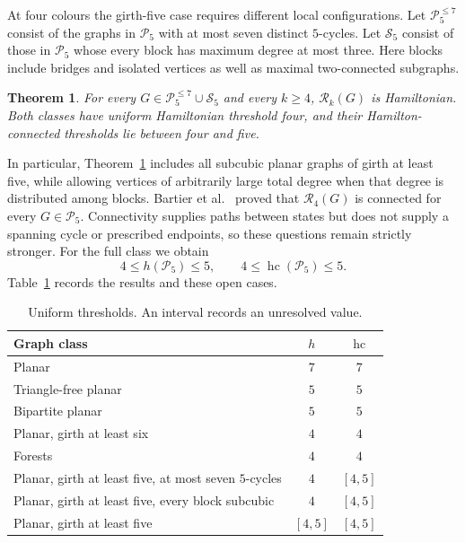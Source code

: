 \documentclass[11pt]{article}
\newtheorem{theorem}{Theorem}[section]
\theoremstyle{remark}
\newcommand{\R}{\mathcal R}
\newcommand{\Rk}{\mathcal R_k}
\newcommand{\hc}{\operatorname{hc}}
\numberwithin{equation}{section}
\numberwithin{table}{section}
\begin{document}
At four colours the girth-five case requires different local
configurations. Let $\mathcal P_5^{\le7}$ consist of the graphs in
$\mathcal P_5$ with at most seven distinct $5$-cycles. Let
$\mathcal S_5$ consist of those in $\mathcal P_5$ whose every block
has maximum degree at most three. Here blocks include bridges and
isolated vertices as well as maximal two-connected subgraphs.

\begin{theorem}\label{thm:main-four}
For every $G\in\mathcal P_5^{\le7}\cup\mathcal S_5$ and every $k\ge4$,
$\Rk(G)$ is Hamiltonian. Both classes have uniform Hamiltonian
threshold four, and their Hamilton-connected thresholds lie between
four and five.
\end{theorem}

In particular, Theorem~\ref{thm:main-four} includes all subcubic planar
graphs of girth at least five, while allowing vertices of arbitrarily
large total degree when that degree is distributed among blocks.
Bartier et al.~\cite{BBFHMP23} proved that $\R_4(G)$ is connected for
every $G\in\mathcal P_5$. Connectivity supplies paths between states but
does not supply a spanning cycle or prescribed endpoints, so these questions
remain strictly stronger. For the full class we obtain
\[
4\le h(\mathcal P_5)\le5,\qquad 4\le\hc(\mathcal P_5)\le5.
\]
Table~\ref{tab:thresholds} records the results and these open cases.

\begin{table}[htbp]
\centering\small
\caption{Uniform thresholds. An interval records an unresolved value.}
\label{tab:thresholds}
\begin{tabularx}{0.82\linewidth}{@{}Xcc@{}}
\toprule
Graph class & $h$ & $\hc$\\
\midrule
Planar & $7$ & $7$\\
Triangle-free planar & $5$ & $5$\\
Bipartite planar & $5$ & $5$\\
Planar, girth at least six & $4$ & $4$\\
Forests & $4$ & $4$\\
Planar, girth at least five, at most seven $5$-cycles & $4$ & $[4,5]$\\
Planar, girth at least five, every block subcubic & $4$ & $[4,5]$\\
Planar, girth at least five & $[4,5]$ & $[4,5]$\\
\bottomrule
\end{tabularx}
\end{table}
\end{document}
